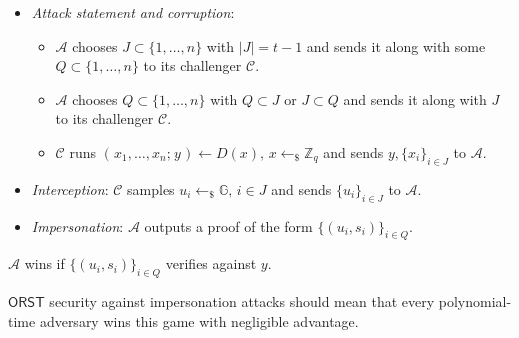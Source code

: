 \documentclass{iacrtrans}
\begin{document}
\begin{itemize}[label=$\bullet$,leftmargin=20pt,rightmargin=0pt]
	\vspace{4pt}
	\item
		\textit{Attack statement and corruption}:
			\begin{itemize}[
				label=$\circ$,leftmargin=17pt,rightmargin=21pt
			]
			\vspace{3pt}
			\item $\mathcal{A}$ chooses $J \subset \{1, \dots, n\}$
				with $|J| = t-1$ and sends it along with some
				$Q \subset \{1, \dots, n\}$
				to its challenger $\mathcal{C}$.
				\vspace{3pt}
			\item $\mathcal{A}$ chooses $Q \subset \{1, \dots, n\}$
				with $Q \subset J$  or $J \subset Q$ and
				sends it along with $J$ to its challenger
				$\mathcal{C}$.
				\vspace{3pt}
			\item $\mathcal{C}$ runs
				$(\hspace{1pt}x_1, \dots, x_n;\hspace{1pt} y\hspace{1pt})
				\leftarrow D(x),\hspace{2pt} x \leftarrow_\$ \mathbb{Z}_q$
				and sends $y, \{x_i\}_{i \in J}$
				to $\mathcal{A}$.
			\vspace{3pt}
			\end{itemize}
	\item
		\textit{Interception}:
		$\mathcal{C}$ samples
		$u_i \leftarrow_\$ \mathbb{G},\hspace{2pt} i \in J$
		and sends $\{u_i\}_{i \in J}$
		to $\mathcal{A}$.\vspace{3pt}
	\item \textit{Impersonation}:
		$\mathcal{A}$ outputs a proof of the form
		$\{(u_i, s_i)\}_{i \in Q}$.
\vspace{4pt}
\end{itemize}
\hspace*{5pt}%
\begin{minipage}{\dimexpr\textwidth-\parindent\relax}%
\hspace{3pt}
$\mathcal{A}$ wins if
$\{(u_i, s_i)\}_{i \in Q}$ verifies against $y$.
\vspace{5pt}
\end{minipage}%

\noindent
$\mathsf{ORST}$ security against impersonation attacks
should mean that every polynomial-time adversary wins this game
with negligible advantage.
\end{document}

